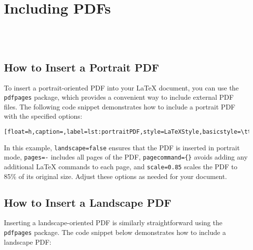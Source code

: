 \chapter{Including PDFs}\label{sec:includingpdfs}
	\\

	\\
	
	\section{How to Insert a Portrait PDF}
		To insert a portrait-oriented PDF into your LaTeX document, you can use the \texttt{pdfpages} package, which provides a convenient way to include external PDF files. 
		The following code snippet demonstrates how to include a portrait PDF with the specified options:
		
		\begin{lstlisting}[float=h,caption=,label=lst:portraitPDF,style=LaTeXStyle,basicstyle=\ttfamily,]

		\end{lstlisting}
		
		In this example, \lstinline|landscape=false| ensures that the PDF is inserted in portrait mode, \lstinline|pages=-| includes all pages of the PDF, \lstinline|pagecommand={}| avoids adding any additional LaTeX commands to each page, and \lstinline|scale=0.85| scales the PDF to 85\% of its original size. 
		Adjust these options as needed for your document.
		
		
	\section{How to Insert a Landscape PDF}
		Inserting a landscape-oriented PDF is similarly straightforward using the \texttt{pdfpages} package. 
		The code snippet below demonstrates how to include a landscape PDF:
		
